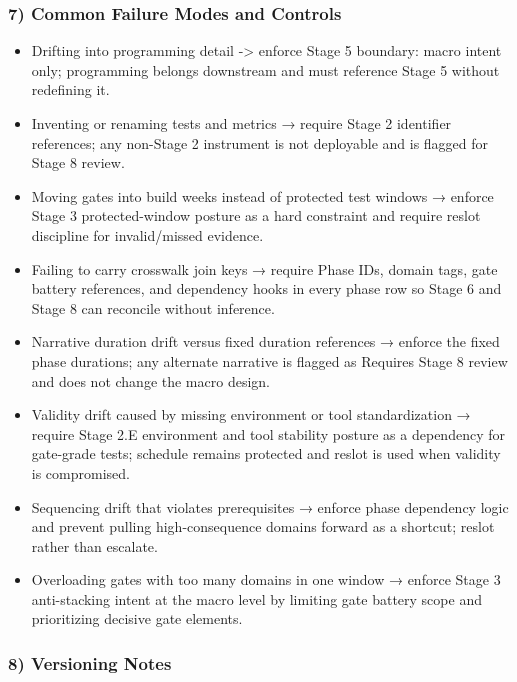 \documentclass[10pt]{article}
\begin{document}
\subsubsection*{7) Common Failure Modes and Controls}

\begin{itemize}
\item Drifting into programming detail -> enforce Stage 5 boundary: macro intent only; programming belongs downstream and must reference Stage 5 without redefining it.
\item Inventing or renaming tests and metrics → require Stage 2 identifier references; any non-Stage 2 instrument is not deployable and is flagged for Stage 8 review.
\item Moving gates into build weeks instead of protected test windows → enforce Stage 3 protected-window posture as a hard constraint and require reslot discipline for invalid/missed evidence.
\item Failing to carry crosswalk join keys → require Phase IDs, domain tags, gate battery references, and dependency hooks in every phase row so Stage 6 and Stage 8 can reconcile without inference.
\item Narrative duration drift versus fixed duration references → enforce the fixed phase durations; any alternate narrative is flagged as Requires Stage 8 review and does not change the macro design.
\item Validity drift caused by missing environment or tool standardization → require Stage 2.E environment and tool stability posture as a dependency for gate-grade tests; schedule remains protected and reslot is used when validity is compromised.
\item Sequencing drift that violates prerequisites → enforce phase dependency logic and prevent pulling high-consequence domains forward as a shortcut; reslot rather than escalate.
\item Overloading gates with too many domains in one window → enforce Stage 3 anti-stacking intent at the macro level by limiting gate battery scope and prioritizing decisive gate elements.
\end{itemize}

\subsubsection*{8) Versioning Notes}
\end{document}
